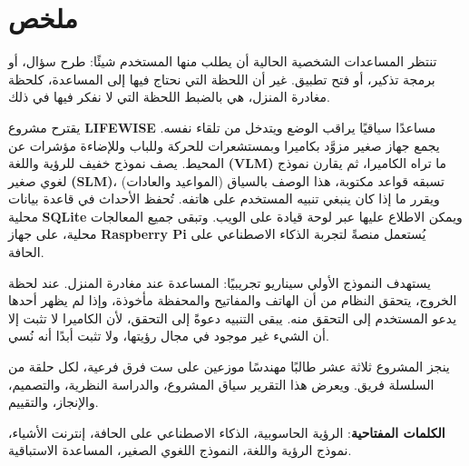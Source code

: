 \chapter*{\textcolor{mycolor}{\textarabic{ملخص}}}

\begin{Arabic}
\large

تنتظر المساعدات الشخصية الحالية أن يطلب منها المستخدم شيئًا: طرح سؤال، أو برمجة تذكير، أو فتح تطبيق. غير أن اللحظة التي نحتاج فيها إلى المساعدة، كلحظة مغادرة المنزل، هي بالضبط اللحظة التي لا نفكر فيها في ذلك.

يقترح مشروع \textbf{LIFEWISE} مساعدًا سياقيًا يراقب الوضع ويتدخل من تلقاء نفسه. يجمع جهاز صغير مزوَّد بكاميرا وبمستشعرات للحركة وللباب وللإضاءة مؤشرات عن المحيط. يصف نموذج خفيف للرؤية واللغة \textbf{(VLM)} ما تراه الكاميرا، ثم يقارن نموذج لغوي صغير \textbf{(SLM)}، تسبقه قواعد مكتوبة، هذا الوصف بالسياق (المواعيد والعادات) ويقرر ما إذا كان ينبغي تنبيه المستخدم على هاتفه. تُحفظ الأحداث في قاعدة بيانات محلية \textbf{SQLite} ويمكن الاطلاع عليها عبر لوحة قيادة على الويب. وتبقى جميع المعالجات محلية، على جهاز \textenglish{\textbf{Raspberry Pi}} يُستعمل منصةً لتجربة الذكاء الاصطناعي على الحافة.

يستهدف النموذج الأولي سيناريو تجريبيًا: المساعدة عند مغادرة المنزل. عند لحظة الخروج، يتحقق النظام من أن الهاتف والمفاتيح والمحفظة مأخوذة، وإذا لم يظهر أحدها يدعو المستخدم إلى التحقق منه. يبقى التنبيه دعوةً إلى التحقق، لأن الكاميرا لا تثبت إلا أن الشيء غير موجود في مجال رؤيتها، ولا تثبت أبدًا أنه نُسي.

ينجز المشروع ثلاثة عشر طالبًا مهندسًا موزعين على ست فرق فرعية، لكل حلقة من السلسلة فريق. ويعرض هذا التقرير سياق المشروع، والدراسة النظرية، والتصميم، والإنجاز، والتقييم.

\vspace{0.5cm}

\textbf{الكلمات المفتاحية}: الرؤية الحاسوبية، الذكاء الاصطناعي على الحافة، إنترنت الأشياء، نموذج الرؤية واللغة، النموذج اللغوي الصغير، المساعدة الاستباقية.

\end{Arabic}
